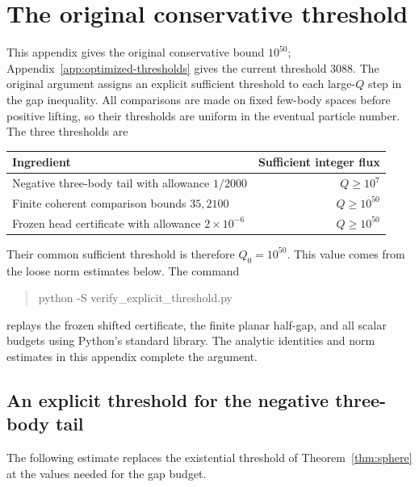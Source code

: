 \documentclass[11pt]{article}
\begin{document}
\appendix
\section{The original conservative threshold}\label{app:explicit-thresholds}
This appendix gives the original conservative bound $10^{50}$;
Appendix~\ref{app:optimized-thresholds} gives the current threshold $3088$.
The original argument assigns an explicit sufficient threshold to each
large-$Q$ step in the gap inequality.
 All comparisons are made on fixed few-body spaces before positive
lifting, so their thresholds are uniform in the eventual particle number.
The three thresholds are
\begin{center}
\begin{tabular}{lr}
\toprule
Ingredient & Sufficient integer flux\\
\midrule
Negative three-body tail with allowance $1/2000$ & $Q\ge10^7$\\
Finite coherent comparison bounds $35,2100$ & $Q\ge10^{50}$\\
Frozen head certificate with allowance $2\times10^{-6}$ & $Q\ge10^{50}$\\
\bottomrule
\end{tabular}
\end{center}
Their common sufficient threshold is therefore $Q_0=10^{50}$. This
value comes from the loose norm estimates below. The command
\begin{quote}\ttfamily python -S verify\_explicit\_threshold.py\end{quote}
replays the frozen shifted certificate, the finite planar half-gap, and all
scalar budgets using Python's standard library. The analytic
identities and norm estimates in this appendix complete the argument.
\subsection{An explicit threshold for the negative three-body tail}
\label{app:explicit-tail}

The following estimate replaces the existential threshold of
Theorem~\ref{thm:sphere} at the values needed for the gap budget.
\end{document}
